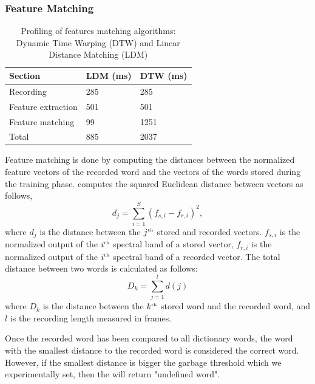 \subsubsection{Feature Matching}
\begin{table}
	\centering
	\caption{Profiling of features matching algorithms: Dynamic Time Warping (DTW) and Linear Distance Matching (LDM)}
	\label{tab:profiling}
	\begin{tabular}{lll} \hline
	Section & LDM (ms) & DTW (ms) \\\hline
	Recording & 285  & 285 \\
	Feature extraction & 501 & 501 \\
	Feature matching &  99 & 1251 \\\hline
	Total & 885 & 2037 \\\hline
	\end{tabular}
\end{table}
%
Feature matching is done by computing the distances between the normalized feature vectors of the recorded word and the vectors of the words stored during the training phase. 
\cim computes the squared Euclidean distance between vectors as follows,
\begin{equation}
	 	d_j = \sum\limits^S_{i=1} (f_{s,i} - f_{r,i})^2,
    \label{eq:frame_dist}
\end{equation}
where $d_j$ is the distance between the $j^{\text{\tiny th}}$ stored and recorded vectors. $f_{s,i}$ is the normalized output of the $i^{\text{\tiny th}}$ spectral band of a stored vector, $f_{r,i}$ is the normalized output of the $i^{\text{\tiny th}}$ spectral band of a recorded vector. 
The total distance between two words is calculated as follows:
\begin{equation}
		D_k = \sum\limits^{l}_{j=1} d(j)
\end{equation}
where $D_k$ is the distance between the $k^{\text{\tiny th}}$ stored word and the recorded word, and $l$ is the recording length measured in frames.

Once the recorded word has been compared to all \cim dictionary words, the word with the smallest distance to the recorded word is considered the correct word. However, if the smallest distance is bigger the garbage threshold  which we experimentally set, then the \cim will return "undefined word". 

